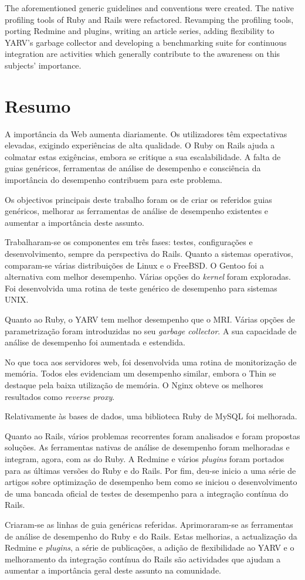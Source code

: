 The aforementioned generic guidelines and conventions were created. The native profiling tools of Ruby and Rails were refactored. Revamping the profiling tools, porting Redmine and plugins, writing an article series, adding flexibility to YARV's garbage collector and developing a benchmarking suite for continuous integration are activities which generally contribute to the awareness on this subjects' importance.

\chapter*{Resumo}

A importância da Web aumenta diariamente. Os utilizadores têm expectativas elevadas, exigindo experiências de alta qualidade. O Ruby on Rails ajuda a colmatar estas exigências, embora se critique a sua escalabilidade. A falta de guias genéricos, ferramentas de análise de desempenho e consciência da importância do desempenho contribuem para este problema.

Os objectivos principais deste trabalho foram os de criar os referidos guias genéricos, melhorar as ferramentas de análise de desempenho existentes e aumentar a importância deste assunto.

Trabalharam-se os componentes em três fases: testes, configurações e desenvolvimento, sempre da perspectiva do Rails. Quanto a sistemas operativos, comparam-se várias distribuições de Linux e o FreeBSD. O Gentoo foi a alternativa com melhor desempenho. Várias opções do \textit{kernel} foram exploradas. Foi desenvolvida uma rotina de teste genérico de desempenho para sistemas UNIX.

Quanto ao Ruby, o YARV tem melhor desempenho que o MRI. Várias opções de parametrização foram introduzidas no seu \textit{garbage collector}. A sua capacidade de análise de desempenho foi aumentada e estendida.

No que toca aos servidores web, foi desenvolvida uma rotina de monitorização de memória. Todos eles evidenciam um desempenho similar, embora o Thin se destaque pela baixa utilização de memória. O Nginx obteve os melhores resultados como \textit{reverse proxy}.

Relativamente às bases de dados, uma biblioteca Ruby de MySQL foi melhorada.

Quanto ao Rails, vários problemas recorrentes foram analisados e foram propostas soluções. As ferramentas nativas de análise de desempenho foram melhoradas e integram, agora, com as do Ruby. A Redmine e vários \textit{plugins} foram portados para as últimas versões do Ruby e do Rails. Por fim, deu-se inicio a uma série de artigos sobre optimização de desempenho bem como se iniciou o desenvolvimento de uma bancada oficial de testes de desempenho para a integração contínua do Rails.

Criaram-se as linhas de guia genéricas referidas. Aprimoraram-se as ferramentas de análise de desempenho do Ruby e do Rails. Estas melhorias, a actualização da Redmine e \textit{plugins}, a série de publicações, a adição de flexibilidade ao YARV e o melhoramento da integração contínua do Rails são actividades que ajudam a aumentar a importância geral deste assunto na comunidade.
